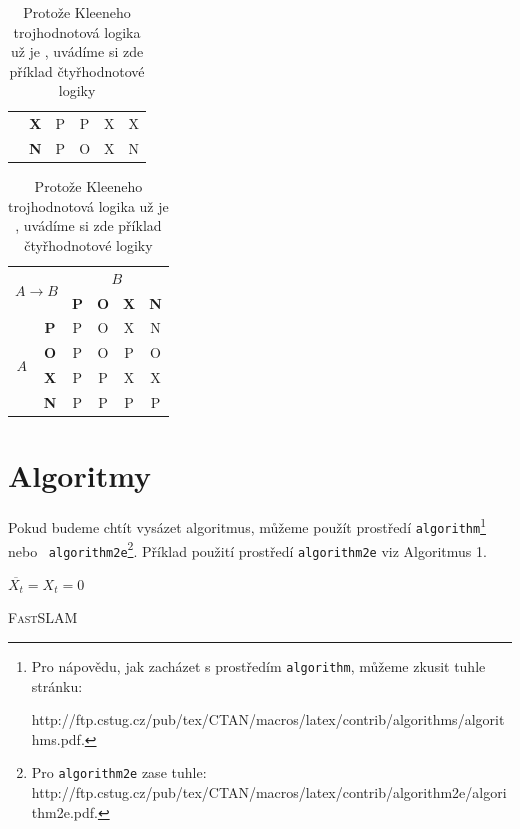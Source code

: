 \documentclass[11pt, a4paper]{article}
\begin{document}
\begin{table}[h]
\begin{tabular}{| c | c | c | c | c | c |}
 & \textbf{X} & P & P & X & X \\ \cline{2-6} 
 & \textbf{N} & P & O & X & N \\ \hline
\end{tabular}
\begin{tabular}{| c | c | c | c | c | c |}
\hline
\multicolumn{2}{|c|}{\multirow{2}{*}{$A \rightarrow B$}} & \multicolumn{4}{c|}{$B$} \\ \cline{3-6} 
\multicolumn{2}{|c|}{} & \textbf{P} & \textbf{O} & \textbf{X} & \textbf{N} \\ \hline
\multirow{4}{*}{$A$} & \textbf{P} & P & O & X & N \\ \cline{2-6} 
 & \textbf{O} & P & O & P & O \\ \cline{2-6} 
 & \textbf{X} & P & P & X & X \\ \cline{2-6} 
 & \textbf{N} & P & P & P & P \\ \hline
\end{tabular}
\caption{Protože Kleeneho trojhodnotová logika už je , uvádíme si zde příklad čtyřhodnotové logiky}
\end{table}

\section{Algoritmy}
Pokud budeme chtít vysázet algoritmus, můžeme použít prostředí \verb|algorithm|\footnote{Pro nápovědu, jak zacházet s prostředím \verb|algorithm|, můžeme zkusit tuhle stránku:\par
http://ftp.cstug.cz/pub/tex/CTAN/macros/latex/contrib/algorithms/algorithms.pdf.} nebo \ \verb|algorithm2e|\footnote{Pro \verb|algorithm2e| zase tuhle: http://ftp.cstug.cz/pub/tex/CTAN/macros/latex/contrib/algorithm2e/algorithm2e.pdf.}. Příklad použití prostředí \verb|algorithm2e| viz Algoritmus 1.

\vspace{0.7cm}
\IncMargin{1em}
\begin{algorithm}[H]
\SetAlgoNoLine
\SetEndCharOfAlgoLine{}
\Indm
{}
\Indpp \Indp
\SetNlSkip{-1mm}
\BlankLine
 $\overline{X_t} = X_t = 0 $\; 
 \caption{\textsc{FastSLAM}}
\end{algorithm}
\DecMargin{1em}
\vspace{0.7cm}
\end{document}
